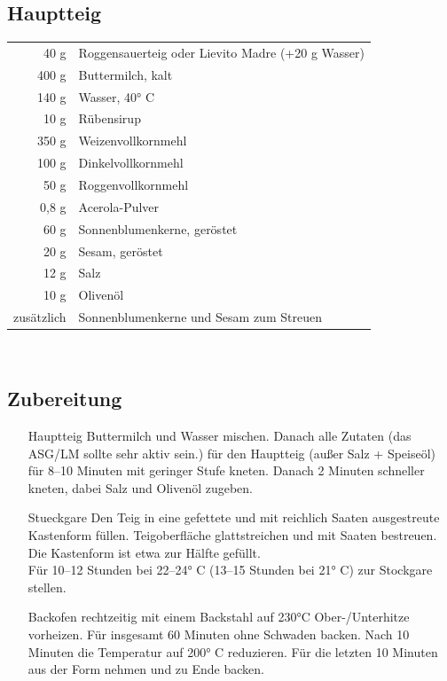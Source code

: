  
\subsection*{Hauptteig}
\begin{tabular}{r l}
          40 g & Roggensauerteig oder Lievito Madre (+20 g Wasser) \\
         400 g & Buttermilch, kalt                                 \\
         140 g & Wasser, 40° C                                     \\
          10 g & Rübensirup                                        \\
         350 g & Weizenvollkornmehl                                \\
         100 g & Dinkelvollkornmehl                                \\
          50 g & Roggenvollkornmehl                                \\
         0,8 g & Acerola-Pulver                                    \\
          60 g & Sonnenblumenkerne, geröstet                       \\
          20 g & Sesam, geröstet                                   \\
          12 g & Salz                                              \\
          10 g & Olivenöl                                          \\
    zusätzlich & Sonnenblumenkerne und Sesam zum Streuen
\end{tabular}\\

\subsection*{Zubereitung}

\begin{enumerate}
    \item [\Gls{Hauptteig}]  Buttermilch und Wasser mischen. Danach alle Zutaten (das ASG/LM sollte sehr aktiv sein.) für den Hauptteig (außer Salz + Speiseöl) für 8–10 Minuten mit geringer Stufe kneten. Danach 2 Minuten schneller kneten, dabei Salz und Olivenöl zugeben. 
    \item [\Gls{Stueckgare}] 
    Den Teig in eine gefettete und mit reichlich Saaten ausgestreute Kastenform füllen. Teigoberfläche glattstreichen und mit Saaten bestreuen. Die Kastenform ist etwa zur Hälfte gefüllt.\\
    Für 10–12 Stunden bei 22–24° C (13–15 Stunden bei 21° C) zur Stockgare stellen. 
    \item[\GLS{Backen}]
    Backofen rechtzeitig mit einem Backstahl auf 230°C Ober-/Unterhitze vorheizen. Für insgesamt 60 Minuten ohne Schwaden backen. Nach 10 Minuten die Temperatur auf 200° C reduzieren. Für die letzten 10 Minuten aus der Form nehmen und zu Ende backen.
\end{enumerate}


